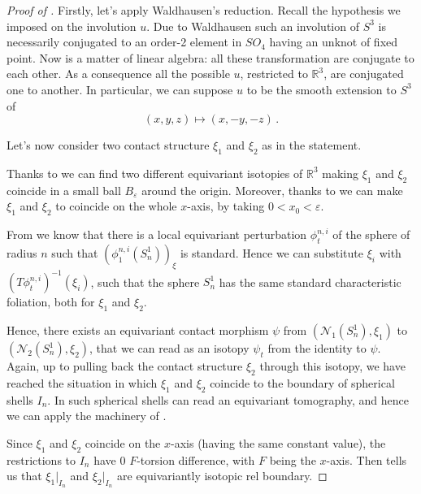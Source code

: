 \documentclass[a4paper, 11pt]{amsart}
\theoremstyle{plain}
\theoremstyle{definition}
\newcommand{\R}{\mathbb{R}}
\newcommand{\NN}{\mathcal{N}}
\renewcommand{\epsilon}{\varepsilon}
\begin{document}
\begin{proof}[Proof of ]
	Firstly, let's apply Waldhausen's reduction. Recall the hypothesis we imposed on the involution $u$. Due to Waldhausen \cite{MR236916} such an involution of $S^3$ is necessarily conjugated to an order-2 element in $SO_4$ having an unknot of fixed point. Now is a matter of linear algebra: all these transformation are conjugate to each other. As a consequence all the possible $u$, restricted to $\R^3$, are conjugated one to another. In particular, we can suppose $u$ to be the smooth extension to $S^3$ of
	\[
		(x,y,z) \mapsto (x,-y,-z)\,.
	\]
	
	Let's now consider two contact structure $\xi_1$ and $\xi_2$ as in the statement.
	
	Thanks to  we can find two different equivariant isotopies of $\R^3$ making $\xi_1$ and $\xi_2$ coincide in a small ball $B_\epsilon$ around the origin. Moreover, thanks to  we can make $\xi_1$ and $\xi_2$ to coincide on the whole $x$-axis, by taking $0 < x_0 <\epsilon$.
	
	From  we know that there is a local equivariant perturbation $\phi^{n,i}_t$ of the sphere of radius $n$ such that $(\phi^{n,i}_1(S^1_n))_\xi$ is standard. Hence we can substitute $\xi_i$ with $(T\phi_t^{n,i})^{-1}(\xi_i)$, such that the sphere $S^1_n$ has the same standard characteristic foliation, both for $\xi_1$ and $\xi_2$.
	
	Hence, there exists an equivariant contact morphism $\psi$ from $(\NN_1(S^1_n), \xi_1)$ to $(\NN_2(S^1_n), \xi_2)$, that we can read as an isotopy $\psi_t$ from the identity to $\psi$. Again, up to pulling back the contact structure $\xi_2$ through this isotopy, we have reached the situation in which $\xi_1$ and $\xi_2$ coincide to the boundary of spherical shells $I_n$. In such spherical shells can read an equivariant tomography, and hence we can apply the machinery of .
	
	Since $\xi_1$ and $\xi_2$ coincide on the $x$-axis (having the same constant value), the restrictions to $I_n$ have $0$ $F$-torsion difference, with $F$ being the $x$-axis. Then  tells us that $\xi_1|_{I_n}$ and $\xi_2|_{I_n}$ are equivariantly isotopic rel boundary.
\end{proof}
\end{document}
